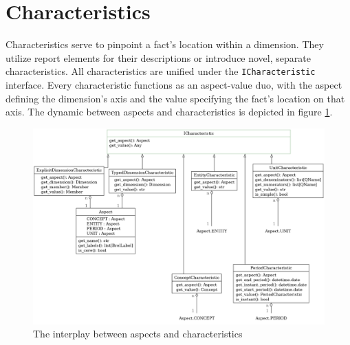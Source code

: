 \section{Characteristics}
\label{sec:characteristics}

Characteristics serve to pinpoint a fact's location within a dimension. 
They utilize report elements for their descriptions or introduce novel, separate characteristics.
All characteristics are unified under the \texttt{ICharacteristic} interface. 
Every characteristic functions as an aspect-value duo, 
with the aspect defining the dimension's axis and the value specifying the fact's location on that axis. 
The dynamic between aspects and characteristics is depicted in figure \ref{fig:characteristics}.

\begin{figure}[H]
    \centering
    \includegraphics[width=\textwidth]{images/brel_characteristics_classes.png}
    \caption{The interplay between aspects and characteristics}
    \label{fig:characteristics}
\end{figure}



